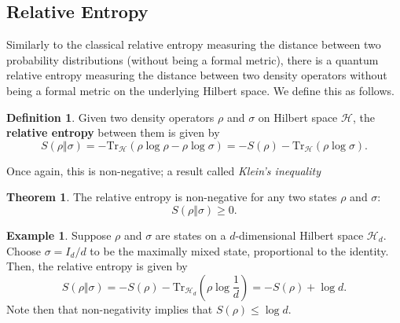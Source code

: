 \documentclass[12pt,a4paper]{report}
\numberwithin{equation}{section}
\newcommand{\tr}{\text{Tr}}
\theoremstyle{definition}
\newtheorem{definition}{Definition}[section]
\theoremstyle{theorem}
\newtheorem{theorem}{Theorem}[section]
\theoremstyle{theorem}
\theoremstyle{example}
\newtheorem{example}{Example}[section]
\theoremstyle{definition}
\begin{document}
\subsection{Relative Entropy}
Similarly to the classical relative entropy measuring the distance between two probability distributions (without being a formal metric), there is a quantum relative entropy measuring the distance between two density operators without being a formal metric on the underlying Hilbert space. We define this as follows.
\begin{definition}
	Given two density operators $\rho$ and $\sigma$ on Hilbert space $\mathcal{H}$, the \textbf{relative entropy} between them is given by
	\begin{equation}
		S(\rho\Vert\sigma)=-\tr_{\mathcal{H}}\left(\rho\log\rho-\rho\log\sigma\right)=-S(\rho)-\tr_{\mathcal{H}}\left(\rho\log\sigma\right).
	\end{equation}
\end{definition}
Once again, this is non-negative; a result called \textit{Klein's inequality}
\begin{theorem}
	The relative entropy is non-negative for any two states $\rho$ and $\sigma$:
	\begin{equation}
		S(\rho\Vert\sigma)\geq 0.
	\end{equation}
\end{theorem}
\begin{example}
	Suppose $\rho$ and $\sigma$ are states on a $d$-dimensional Hilbert space $\mathcal{H}_{d}$. Choose $\sigma=I_{d}/d$ to be the maximally mixed state, proportional to the identity. Then, the relative entropy is given by
	\begin{equation}
		S(\rho\Vert\sigma)=-S(\rho)-\tr_{\mathcal{H}_{d}}\left(\rho\log{\frac{1}{d}}\right)=-S(\rho)+\log{d}.
	\end{equation}
	Note then that non-negativity implies that $S(\rho)\leq\log{d}$.
\end{example}
\end{document}
